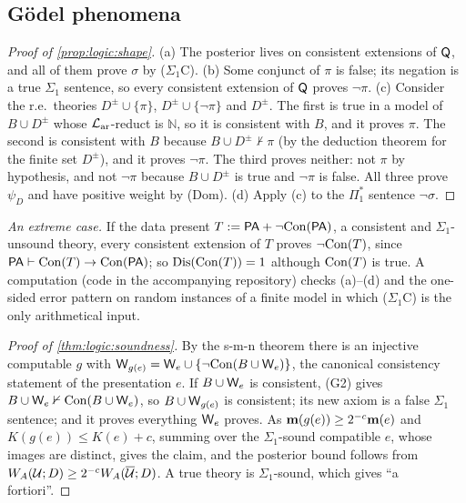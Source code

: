 \subsection{G\"odel phenomena}\label{app:logic:goedel}

\begin{proof}[Proof of \cref{prop:logic:shape}]
(a) The posterior lives on consistent extensions of $\mathsf{Q}$, and all of them prove $\sigma$ by ($\Sigma_1$C). (b) Some conjunct of $\pi$ is false; its negation is a true $\Sigma_1$ sentence, so every consistent extension of $\mathsf{Q}$ proves $\neg\pi$. (c) Consider the r.e.\ theories $D^\pm\cup\{\pi\}$, $D^\pm\cup\{\neg\pi\}$ and $D^\pm$. The first is true in a model of $B\cup D^\pm$ whose $\mathcal{L}_{\mathrm{ar}}$-reduct is $\mathbb N$, so it is consistent with $B$, and it proves $\pi$. The second is consistent with $B$ because $B\cup D^\pm\nvdash\pi$ (by the deduction theorem for the finite set $D^\pm$), and it proves $\neg\pi$. The third proves neither: not $\pi$ by hypothesis, and not $\neg\pi$ because $B\cup D^\pm$ is true and $\neg\pi$ is false. All three prove $\psi_D$ and have positive weight by (Dom). (d) Apply (c) to the $\Pi_1^*$ sentence $\neg\sigma$.
\end{proof}

\emph{An extreme case.} If the data present $T:=\mathsf{PA}+\neg\mathrm{Con}(\mathsf{PA})$, a consistent and $\Sigma_1$-unsound theory, every consistent extension of $T$ proves $\neg\mathrm{Con}(T)$, since $\mathsf{PA}\vdash\mathrm{Con}(T)\to\mathrm{Con}(\mathsf{PA})$; so $\mathrm{Dis}(\mathrm{Con}(T))=1$ although $\mathrm{Con}(T)$ is true. A computation (code in the accompanying repository) checks (a)--(d) and the one-sided error pattern on random instances of a finite model in which ($\Sigma_1$C) is the only arithmetical input.

\begin{proof}[Proof of \cref{thm:logic:soundness}]
By the s-m-n theorem there is an injective computable $g$ with $\mathsf{W}_{g(e)}=\mathsf{W}_{e}\cup\{\neg\mathrm{Con}(B\cup\mathsf{W}_{e})\}$, the canonical consistency statement of the presentation $e$. If $B\cup\mathsf{W}_{e}$ is consistent, (G2) gives $B\cup\mathsf{W}_{e}\nvdash\mathrm{Con}(B\cup\mathsf{W}_{e})$, so $B\cup\mathsf{W}_{g(e)}$ is consistent; its new axiom is a false $\Sigma_1$ sentence; and it proves everything $\mathsf{W}_{e}$ proves. As $\mathbf{m}(g(e))\ge2^{-c}\mathbf{m}(e)$ and $K(g(e))\le K(e)+c$, summing over the $\Sigma_1$-sound compatible $e$, whose images are distinct, gives the claim, and the posterior bound follows from $W_{A}(\mathcal U;D)\ge2^{-c}W_{A}(\overline{\mathcal U};D)$. A true theory is $\Sigma_1$-sound, which gives ``a fortiori''.
\end{proof}


